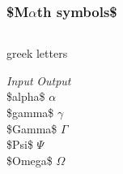 \documentclass{beamer}
\begin{document}
\begin{frame}
    \frametitle{\$M$\alpha$th symbols\$}
  
    \begin{columns}

    \begin{column}{4cm}      
    \begin{block}{greek letters}
        \begin{tabbing}
            {\em Input} \hspace{1.8cm} \= {\em Output} \\
            \$\bs alpha\$ \> $\alpha$ \\
            \$\bs gamma\$ \> $\gamma$ \\
            \$\bs Gamma\$ \> $\Gamma$ \\
            \$\bs Psi\$ \> $\Psi$ \\
            \$\bs Omega\$ \> $\Omega$ \\
    \end{tabbing}
    \end{block}
    \end{column}

    
    \end{columns}

\end{frame}
\end{document}

